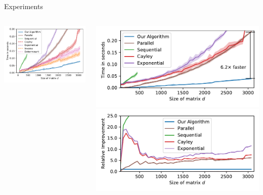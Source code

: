 \begin{frame}{Experiments}
	\begin{columns}
		\begin{column}{0.49\textwidth}
			\vspace{1em}
			\centering
			\includegraphics[width=\textwidth]{matrix_operations}
		\end{column}
		\begin{column}{0.49\textwidth}
			\vspace{1em}
			\centering
			\includegraphics[width=\textwidth]{running_time}
			\includegraphics[width=\textwidth]{relative}
		\end{column}
	\end{columns}
\end{frame}

